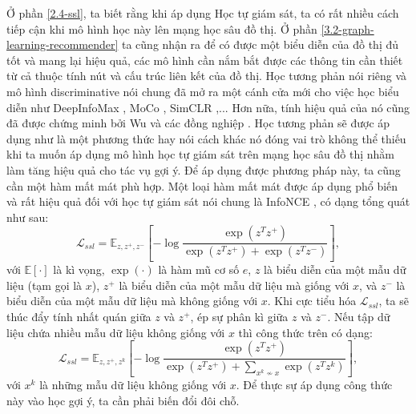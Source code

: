 Ở phần \ref{2.4-ssl}, ta biết rằng khi áp dụng Học tự giám sát, ta có rất nhiều cách tiếp cận khi mô hình học này lên mạng học sâu đồ thị. Ở phần \ref{3.2-graph-learning-recommender} ta cũng nhận ra để có được một biểu diễn của đồ thị đủ tốt và mang lại hiệu quả, các mô hình cần nắm bắt được các thông tin cần thiết từ cả thuộc tính nút và cấu trúc liên kết của đồ thị. Học tương phản nói riêng và mô hình discriminative nói chung đã mở ra một cánh cửa mới cho việc học biểu diễn như DeepInfoMax \cite{DeepInfoMax}, MoCo \cite{MoCo}, SimCLR \cite{SimCLR},... Hơn nữa, tính hiệu quả của nó cũng đã được chứng minh bởi Wu và các đồng nghiệp \cite{SGL}. Học tương phản sẽ được áp dụng như là một phương thức hay nói cách khác nó đóng vai trò không thể thiếu khi ta muốn áp dụng mô hình học tự giám sát trên mạng học sâu đồ thị nhằm làm tăng hiệu quả cho tác vụ gợi ý. Để áp dụng được phương pháp này, ta cũng cần một hàm mất mát phù hợp. Một loại hàm mất mát được áp dụng phổ biến và rất hiệu quả đối với học tự giám sát nói chung là InfoNCE \cite{InfoNCE, ssl-genorcont}, có dạng tổng quát như sau:
\begin{equation}
    \mathcal{L}_\textit{ssl} = \mathbb{E}_{z, z^+, z^-}\left[-\log{\frac{\exp(z^T z^+)}{\exp(z^T z^+) + \exp(z^T z^-)}}\right],
    \label{eq:general-NCE}
\end{equation}
với $\mathbb{E}[\cdot]$ là kì vọng, $\exp(\cdot)$ là hàm mũ cơ số $e$, $z$ là biểu diễn của một mẫu dữ liệu (tạm gọi là $x$), $z^+$ là biểu diễn của một mẫu dữ liệu mà giống với $x$, và $z^-$ là biểu diễn của một mẫu dữ liệu mà không giống với $x$. Khi cực tiểu hóa $\mathcal{L}_\textit{ssl}$, ta sẽ thúc đẩy tính nhất quán giữa $z$ và $z^+$, ép sự phân kì giữa $z$ và $z^-$. Nếu tập dữ liệu chứa nhiều mẫu dữ liệu không giống với $x$ thì công thức trên có dạng:
\begin{equation}
    \mathcal{L}_\textit{ssl} = \mathbb{E}_{z, z^+, z^k}\left[-\log{\frac{\exp(z^T z^+)}{\exp(z^T z^+) + \sum_{x^k \nsim x}{\exp(z^T z^k)}}}\right],
    \label{eq:more-dissim-NCE}
\end{equation}
với $x^k$ là những mẫu dữ liệu không giống với $x$. Để thực sự áp dụng công thức này vào học gợi ý, ta cần phải biến đổi đôi chỗ.

